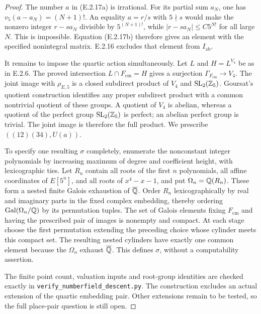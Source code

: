 \begin{proof}
The number \(a\) in (E.2.17a) is irrational. For its partial
sum \(a_N\), one has \(v_5(a-a_N)=(N+1)!\).
An equality \(a=r/s\) with \(5\nmid s\) would make the
nonzero integer \(r-sa_N\) divisible by \(5^{(N+1)!}\),
while \(|r-sa_N|\le C5^{N!}\) for all large \(N\).
This is impossible.
Equation (E.2.17b) therefore gives an element with the
specified nonintegral matrix. E.2.16 excludes that element
from \(I_{\mathrm{ab}}\).

It remains to impose the quartic action simultaneously.
Let \(L\) and \(H=L^{V_4}\) be as in E.2.6.
The proved intersection \(L\cap F_{\mathrm{cm}}=H\)
gives a surjection \(\Gamma_{F_{\mathrm{cm}}}\to V_4\).
The joint image with \(\rho_{E,5}\) is a closed subdirect
product of \(V_4\) and \(\mathrm{SL}_2(\mathbb Z_5)\).
Goursat's quotient construction identifies any proper
subdirect product with a common nontrivial quotient of
these groups. A quotient of \(V_4\) is abelian, whereas
a quotient of the perfect group
\(\mathrm{SL}_2(\mathbb Z_5)\) is perfect; an abelian perfect
group is trivial. The joint image is therefore the full
product. We prescribe \(((12)(34),U(a))\).

To specify one resulting \(\sigma\) completely, enumerate
the nonconstant integer polynomials by increasing maximum
of degree and coefficient height, with lexicographic ties.
Let \(R_n\) contain all roots of the first \(n\) polynomials,
all affine coordinates of \(E[5^n]\), and all roots of
\(x^4-x-1\), and put \(\Omega_n=\mathbb Q(R_n)\).
These form a nested finite Galois exhaustion of \(\overline{\mathbb Q}\).
Order \(R_n\) lexicographically by real and imaginary parts
in the fixed complex embedding, thereby ordering
\(\operatorname{Gal}(\Omega_n/\mathbb Q)\) by its permutation tuples.
The set of Galois elements fixing \(F_{\mathrm{cm}}\)
and having the prescribed pair of images is nonempty
and compact. At each stage choose the first permutation
extending the preceding choice whose cylinder meets this
compact set. The resulting nested cylinders have exactly
one common element because the \(\Omega_n\) exhaust
\(\overline{\mathbb Q}\). This defines \(\sigma\), without a computability
assertion.

The finite point count, valuation inputs and root-group
identities are checked exactly in
\texttt{verify\_numberfield\_descent.py}.
The construction excludes an actual extension of the
quartic embedding pair. Other extensions remain to be
tested, so the full place-pair question is still open.
\end{proof}

